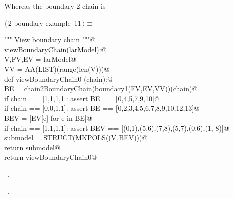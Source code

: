 \documentclass[11pt,oneside]{article}    %
\begin{document}
Whereas the boundary 2-chain is
\begin{flushleft} \small \label{scrap19}
\protect{}$\langle\,$2-boundary example\nobreak\ {\footnotesize 11}$\,\rangle\equiv$
\vspace{-1ex}
\begin{list}{}{} \item
\mbox{}\verb@""" View boundary chain """@\\
\mbox{}\verb@def viewBoundaryChain(larModel):@\\
\mbox{}\verb@    V,FV,EV = larModel@\\
\mbox{}\verb@    VV = AA(LIST)(range(len(V)))@\\
\mbox{}\verb@    def viewBoundaryChain0 (chain):@\\
\mbox{}\verb@        BE = chain2BoundaryChain(boundary1(FV,EV,VV))(chain)@\\
\mbox{}\verb@        if chain == [1,1,1,1]: assert BE == [0,4,5,7,9,10]@\\
\mbox{}\verb@        if chain == [0,0,1,1]: assert BE == [0,2,3,4,5,6,7,8,9,10,12,13]@\\
\mbox{}\verb@        BEV = [EV[e] for e in BE]@\\
\mbox{}\verb@        if chain == [1,1,1,1]: assert BEV == [(0,1),(5,6),(7,8),(5,7),(0,6),(1, 8)]@\\
\mbox{}\verb@        submodel = STRUCT(MKPOLS((V,BEV)))@\\
\mbox{}\verb@        return submodel@\\
\mbox{}\verb@    return viewBoundaryChain0@\\
\mbox{}\verb@@{\NWsep}
\end{list}
\vspace{-1ex}
\footnotesize\addtolength{\baselineskip}{-1ex}
\begin{list}{}{\setlength{\itemsep}{-\parsep}\setlength{\itemindent}{-\leftmargin}}
\item \NWtxtMacroDefBy\ .
\item \NWtxtMacroRefIn\ .
\end{list}
\end{flushleft}
\end{document}
